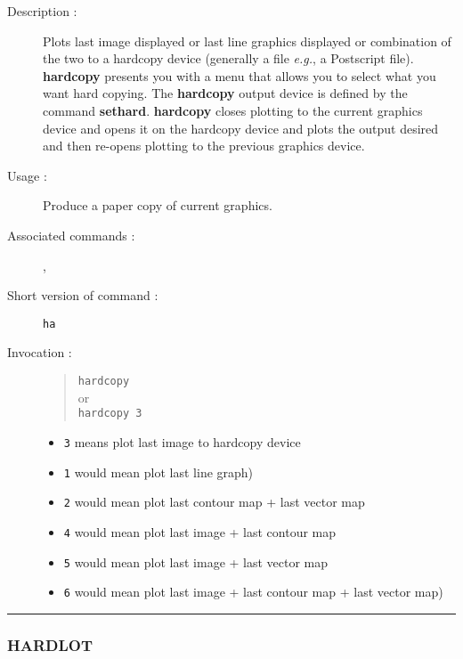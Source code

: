 \begin{description}

\item[Description :] Plots last image displayed or last line graphics
displayed or combination of the two to a hardcopy device (generally a
file \emph{e.g.}, a Postscript file).  {\bf hardcopy} presents you with
a menu that allows you to select what you want hard copying.  The {\bf
hardcopy} output device is defined by the command {\bf sethard}.  {\bf
hardcopy} closes plotting to the current graphics device and opens it
on the hardcopy device and plots the output desired and then re-opens
plotting to the previous graphics device.

\item[Usage :] Produce a paper copy of current graphics.
\item[Associated commands :] {\tt {}}, 
{\tt {}}
\item[Short version of command :] {\tt ha}
\item[Invocation :]

\begin{quote}{\tt  hardcopy }\\
or \\
{\tt hardcopy 3 }
\end{quote}

\begin{itemize}
\item {\tt 3} means plot last image to hardcopy device
\item {\tt 1} would mean plot last line graph)
\item {\tt 2} would mean plot last contour map + last vector map
\item {\tt 4} would mean plot last image + last contour map
\item {\tt 5} would mean plot last image + last vector map
\item {\tt 6} would mean plot last image + last contour map + last vector map)
\end{itemize}

\end{description}

\hrule 
\subsubsection*{\label{HARDLOT}HARDLOT}

